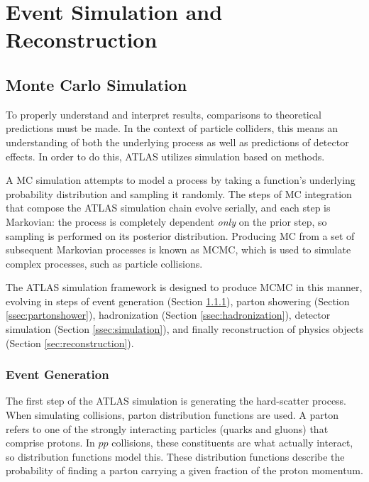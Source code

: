 \chapter{Event Simulation and Reconstruction} \label{ch:eventreco}


\section{Monte Carlo Simulation} \label{sec:simulation}

To properly understand and interpret results, comparisons to theoretical predictions must be made. In the context of particle colliders, this means an understanding of both the underlying process as well as predictions of detector effects. In order to do this, ATLAS utilizes simulation based on  methods. 

A \gls{MC} simulation attempts to model a process by taking a function's underlying probability distribution and sampling it randomly. The steps of \gls{MC} integration that compose the ATLAS simulation chain evolve serially, and each step is Markovian: the process is completely dependent \textit{only} on the prior step, so sampling is performed on its posterior distribution. Producing \gls{MC} from a set of subsequent Markovian processes is known as \gls{MCMC}, which is used to simulate complex processes, such as particle collisions.

The ATLAS simulation framework is designed to produce \gls{MCMC} in this manner, evolving in steps of event generation (Section \ref{ssec:eventgen}), parton showering (Section \ref{ssec:partonshower}), hadronization (Section \ref{ssec:hadronization}), detector simulation (Section \ref{ssec:simulation}), and finally reconstruction of physics objects (Section \ref{sec:reconstruction}).

\subsection{Event Generation} \label{ssec:eventgen}
The first step of the ATLAS simulation is generating the hard-scatter process. When simulating collisions, parton distribution functions are used. A parton refers to one of the strongly interacting particles (quarks and gluons) that comprise protons. In $pp$ collisions, these constituents are what actually interact, so distribution functions model this. These distribution functions describe the probability of finding a parton carrying a given fraction of the proton momentum. 

